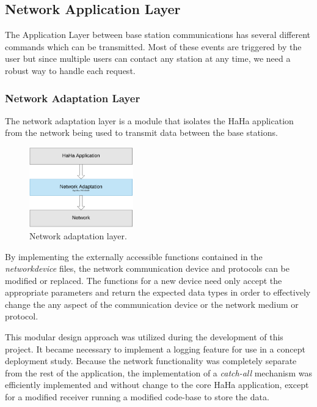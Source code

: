 \documentclass[journal,compsoc]{IEEEtran}
\begin{document}
\subsection{Network Application Layer}

The Application Layer between base station communications has several different commands which can be transmitted.  Most of these events are triggered by the user but since multiple users can contact any station at any time, we need a robust way to handle each request.

\subsubsection{Network Adaptation Layer}

The network adaptation layer is a module that isolates the HaHa application from the network being used to transmit data between the base stations. 

\begin{figure}[ht] 	%
\centering
\includegraphics[width=0.4\textwidth]{NetAdaptation.png}
\caption{ \space Network adaptation layer.}
\label{Network Adaptation}
\end{figure}

By implementing the externally accessible functions contained in the {\it networkdevice} files, the network communication device and protocols can be modified or replaced. The functions for a new device need only accept the appropriate parameters and return the expected data types in order to effectively change the any aspect of the communication device or the network medium or protocol.

This modular design approach was utilized during the development of this project. It became necessary to implement a logging feature for use in a concept deployment study. Because the network functionality was completely separate from the rest of the application, the implementation of a {\it catch-all} mechanism was efficiently implemented and without change to the core HaHa application, except for a modified receiver running a modified code-base to store the data.
\end{document}
